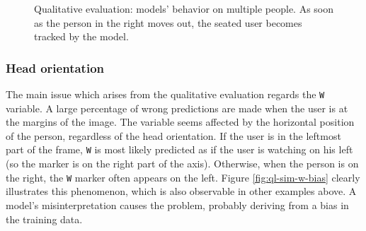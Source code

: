 \begin{figure}[H]
\begin{center}
\begin{subfigure}[h]{0.49\textwidth}
		\end{subfigure}
	\end{center}
	\vspace{-0.5cm}
	\caption[Qualitative evaluation: models' behavior on multiple people]{Qualitative evaluation: models' behavior on multiple people. As soon as the person in the right moves out, the seated user becomes tracked by the model.}
	\label{fig:ql-sim-double-change}
\end{figure}


\subsubsection*{Head orientation}
\label{subsec:ql-issue-w}

The main issue which arises from the qualitative evaluation regards the \texttt{W} variable. A large percentage of wrong predictions are made when the user is at the margins of the image. The variable seems affected by the horizontal position of the person, regardless of the head orientation. If the user is in the leftmost part of the frame, \texttt{W} is most likely predicted as if the user is watching on his left (so the marker is on the right part of the axis). Otherwise, when the person is on the right, the \texttt{W} marker often appears on the left. Figure \ref{fig:ql-sim-w-bias} clearly illustrates this phenomenon, which is also observable in other examples above. A model's misinterpretation causes the problem, probably deriving from a bias in the training data.

